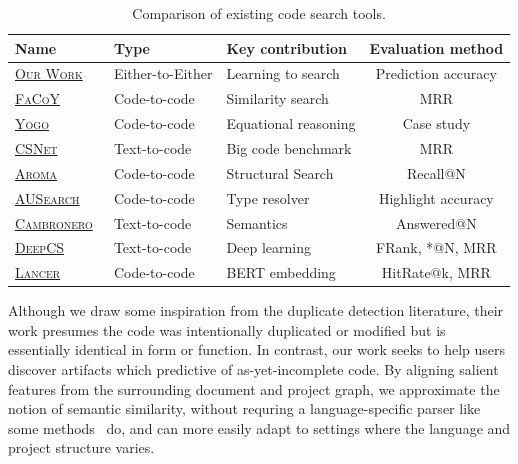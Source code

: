 \documentclass[11pt]{article}
\begin{document}
{ %
\renewcommand{\arraystretch}{1.5}
\begin{table}[H]
  \small
  \begin{tabular}{lllc}
    Name & Type & Key contribution & Evaluation method \\
    \hline
    \href{https://github.com/breandan/gym-fs}{\textsc{Our Work}} & Either-to-Either & Learning to search & Prediction accuracy \\
    \href{https://core.ac.uk/download/pdf/162022846.pdf#page=7}{\textsc{FaCoY}}~\citep{kim2018facoy} & Code-to-code & Similarity search & MRR \\
    \href{https://www.jameskoppel.com/files/papers/yogo-preprint.pdf#page=11}{\textsc{Yogo}}~\cite{premtoon2020semantic}     & Code-to-code & Equational reasoning & Case study \\
    \href{https://arxiv.org/pdf/1909.09436.pdf#page=5}{\textsc{CSNet}}~\citep{husain2019codesearchnet}     & Text-to-code & Big code benchmark & MRR \\
    \href{https://arxiv.org/pdf/1812.01158.pdf#section.5}{\textsc{Aroma}}~\citep{luan2019aroma}     & Code-to-code & Structural Search& Recall@N \\
    \href{https://raw.githubusercontent.com/mhilmiasyrofi/AUSearch/master/SANER_2020_AUSearch.pdf}{\textsc{AUSearch}}~\citep{asyrofi2020ausearch}     & Code-to-code & Type resolver & Highlight accuracy \\

    \href{https://arxiv.org/pdf/1905.03813.pdf#section.4}{\textsc{Cambronero}}~\citep{cambronero2019deep}     & Text-to-code & Semantics & Answered@N \\
    \href{https://guxd.github.io/papers/deepcs.pdf#section.5}{\textsc{DeepCS}}~\citep{gu2018deep}     & Text-to-code & Deep learning & FRank, *@N, MRR \\
    \href{https://www.cs.sjtu.edu.cn/~zhonghao/paper/Lancer.pdf}{\textsc{Lancer}}~\citep{zhou2019lancer}     & Code-to-code & BERT embedding & HitRate@k, MRR \\
  \end{tabular}
  \caption{\label{tab:ad_comparison} Comparison of existing code search tools.}
\end{table}
}

Although we draw some inspiration from the duplicate detection literature, their work presumes the code was intentionally duplicated or modified but is essentially identical in form or function. In contrast, our work seeks to help users discover artifacts which predictive of as-yet-incomplete code. By aligning salient features from the surrounding document and project graph, we approximate the notion of semantic similarity, without requring a language-specific parser like some methods~\citep{cambronero2019deep} do, and can more easily adapt to settings where the language and project structure varies.
\end{document}
